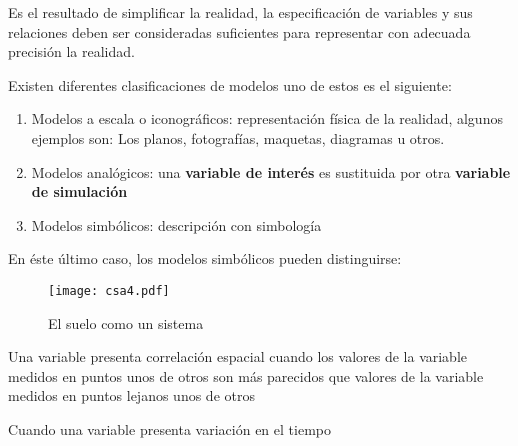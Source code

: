 \begin{definition}[Modelo]
    Es el resultado de simplificar la realidad, la especificación de variables y sus relaciones deben ser consideradas suficientes para representar con adecuada precisión la realidad.
\end{definition}
Existen diferentes clasificaciones de modelos uno de estos es el siguiente:
\begin{enumerate}
    \item Modelos a escala o iconográficos: representación física de la realidad, algunos ejemplos son: Los planos, fotografías, maquetas, diagramas u otros. 
    \item Modelos analógicos: una \textbf{variable de interés} es sustituida por otra \textbf{variable de simulación}
    \item Modelos simbólicos: descripción con simbología
\end{enumerate}
En éste último caso, los modelos simbólicos pueden distinguirse:

 { 
	{}
	{}
 
	\Schema{-1ex}{5ex}
	{}
	{
  
  { \schema
		{}
		{}
	}
		
  }
}

\begin{figure}[h!]
\centering
  \texttt{[image: csa4.pdf]}
  \caption{El suelo como un sistema}
  \label{csa4}
\end{figure}
\begin{definition}
    Una variable presenta correlación espacial cuando los valores de la variable medidos en puntos unos de otros son más parecidos que valores de la variable medidos en puntos lejanos unos de otros
\end{definition}
\begin{definition}
    Cuando una variable presenta variación en el tiempo
\end{definition}
